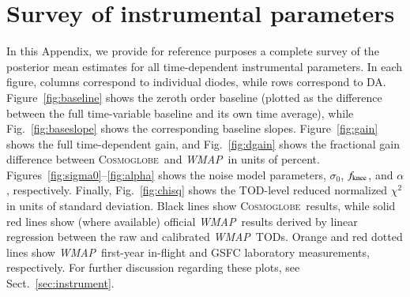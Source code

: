\documentclass[twocolumn]{../../common/aa}
\def\WMAP{\emph{WMAP}}
\newcommand{\cosmoglobe}{\textsc{Cosmoglobe}}
\begin{document}







\appendix

\section{Survey of instrumental parameters}
\label{sec:survey}

\noindent\begin{minipage}{\textwidth}
In this Appendix, we provide for reference purposes a complete survey of the posterior mean estimates for all time-dependent instrumental parameters. In each figure, columns correspond to individual diodes, while rows correspond to DA. Figure~\ref{fig:baseline} shows the zeroth order baseline (plotted as the difference between the full time-variable baseline and its own time average), while Fig.~\ref{fig:baseslope} shows the corresponding baseline slopes. Figure~\ref{fig:gain} shows the full time-dependent gain, and Fig.~\ref{fig:dgain} shows the fractional gain difference between \cosmoglobe\ and \WMAP\ in units of percent. Figures~\ref{fig:sigma0}--\ref{fig:alpha} shows the noise model parameters, $\sigma_0$, $\fknee$, and $\alpha$, respectively. Finally, Fig.~\ref{fig:chisq} shows the TOD-level reduced normalized $\chi^2$ in units of standard deviation. Black lines show \cosmoglobe\ results, while solid red lines show (where available) official \WMAP\ results derived by linear regression between the raw and calibrated \WMAP\ TODs. Orange and red dotted lines show \WMAP\ first-year in-flight and GSFC laboratory measurements, respectively. For further discussion regarding these plots, see Sect.~\ref{sec:instrument}.
\end{minipage}
\end{document}
